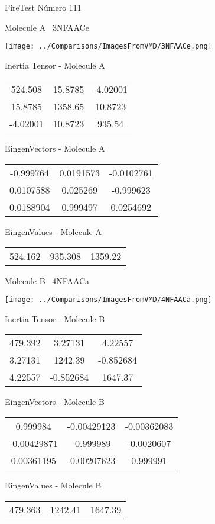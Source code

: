 \vtab[-3cm]
\begin{center}
{\large FireTest \tab Número 111}
\end{center}
\begin{multicols}{2}
\begin{center}

Molecule A \
3NFAACe

\texttt{[image: ../Comparisons/ImagesFromVMD/3NFAACe.png]}

Inertia Tensor - Molecule A \\
\begin{tabular}{|c c c|}
524.508	 & 	15.8785	 & 	-4.02001	 \\
15.8785	 & 	1358.65	 & 	10.8723	 \\
-4.02001	 & 	10.8723	 & 	935.54
\end{tabular}

\vtab
 EingenVectors - Molecule A     \\
\begin{tabular}{|c c c|}
-0.999764	 & 	0.0191573	 & 	-0.0102761	 \\
0.0107588	 & 	0.025269	 & 	-0.999623	 \\
0.0188904	 & 	0.999497	 & 	0.0254692
\end{tabular}

\vtab
 EingenValues - Molecule A     \\
\begin{tabular}{|c c c|}
524.162	 & 	935.308	 & 	1359.22	 \\
\end{tabular}
\columnbreak

Molecule B \
4NFAACa

\texttt{[image: ../Comparisons/ImagesFromVMD/4NFAACa.png]}

Inertia Tensor - Molecule B \\
\begin{tabular}{|c c c|}
479.392	 & 	3.27131	 & 	4.22557	 \\
3.27131	 & 	1242.39	 & 	-0.852684	 \\
4.22557	 & 	-0.852684	 & 	1647.37
\end{tabular}

\vtab
 EingenVectors - Molecule B     \\
\begin{tabular}{|c c c|}
0.999984	 & 	-0.00429123	 & 	-0.00362083	 \\
-0.00429871	 & 	-0.999989	 & 	-0.0020607	 \\
0.00361195	 & 	-0.00207623	 & 	0.999991
\end{tabular}

\vtab
 EingenValues - Molecule B     \\
\begin{tabular}{|c c c|}
479.363	 & 	1242.41	 & 	1647.39	 \\
\end{tabular}

\end{center}
\end{multicols}

